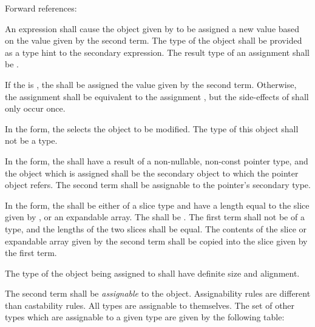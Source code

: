 Forward references: 

\specsubsubitem
An  expression shall cause the object given by
 to be assigned a new value based on the value
given by the second term. The type of the object shall be provided as a type
hint to the secondary expression. The result type of an assignment shall be
.

\specsubsubitem
If the  is \terminal{=}, the
 shall be assigned the value given by the second
term. Otherwise, the assignment  shall be equivalent to the
assignment , but the side-effects of  shall only occur
once.

\specsubsubitem
In the  form, the 
selects the object to be modified. The type of this object shall not be a
 type.

\specsubsubitem
In the  form, the
 shall have a result of a non-nullable, non-const
pointer type, and the object which is assigned shall be the secondary object to
which the pointer object refers. The second term shall be assignable to the
pointer's secondary type.

\specsubsubitem
In the  form, the
 shall be either of a slice type and have a length equal
to the slice given by , or an expandable array.
The  shall be \terminal{=}. The first term shall not
be of a  type, and the lengths of the two slices shall be equal.
The contents of the slice or expandable array given by the second term shall be
copied into the slice given by the first term.

\specsubsubitem
The type of the object being assigned to shall have definite size and alignment.

\specsubsubitem
The second term shall be \textit{assignable} to the object. Assignability rules
are different than castability rules. All types are assignable to themselves.
The set of other types which are assignable to a given type are given by the
following table:


